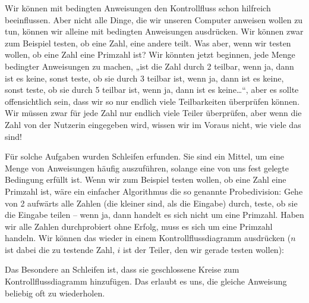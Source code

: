 
Wir können mit bedingten Anweisungen den Kontrollfluss schon hilfreich
beeinflussen. Aber nicht alle Dinge, die wir unseren Computer anweisen wollen
zu tun, können wir alleine mit bedingten Anweisungen ausdrücken. Wir können
zwar zum Beispiel testen, ob eine Zahl, eine andere teilt. Was aber, wenn wir
testen wollen, ob eine Zahl eine Primzahl ist? Wir könnten jetzt beginnen, jede
Menge bedingter Anweisungen zu machen, „ist die Zahl durch 2 teilbar, wenn ja,
dann ist es keine, sonst teste, ob sie durch 3 teilbar ist, wenn ja, dann ist
es keine, sonst teste, ob sie durch 5 teilbar ist, wenn ja, dann ist es
keine\dots“, aber es sollte offensichtlich sein, dass wir so nur endlich viele
Teilbarkeiten überprüfen können. Wir müssen zwar für jede Zahl nur endlich
viele Teiler überprüfen, aber wenn die Zahl von der Nutzerin eingegeben wird,
wissen wir im Voraus nicht, wie viele das sind!

Für solche Aufgaben wurden Schleifen erfunden. Sie sind ein Mittel, um eine
Menge von Anweisungen häufig auszuführen, solange eine von uns fest gelegte
Bedingung erfüllt ist. Wenn wir zum Beispiel testen wollen, ob eine Zahl eine
Primzahl ist, wäre ein einfacher Algorithmus die so genannte Probedivision:
Gehe von 2 aufwärts alle Zahlen (die kleiner sind, als die Eingabe) durch,
teste, ob sie die Eingabe teilen -- wenn ja, dann handelt es sich nicht um eine
Primzahl. Haben wir alle Zahlen durchprobiert ohne Erfolg, muss es sich um eine
Primzahl handeln.  Wir können das wieder in einem Kontrollflussdiagramm
ausdrücken ($n$ ist dabei die zu testende Zahl, $i$ ist der Teiler, den wir
gerade testen wollen):

\begin{center}
\end{center}
Das Besondere an Schleifen ist, dass sie geschlossene Kreise zum
Kontrollflussdiagramm hinzufügen. Das erlaubt es uns, die gleiche Anweisung
beliebig oft zu wiederholen.

